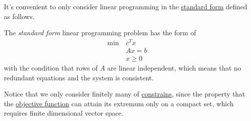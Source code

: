 It's convenient to only consider linear programming in the \hyperref[def:standard-form]{standard form} defined as follows.

\begin{definition}\label{def:standard-form}
	The \emph{standard form} linear programming problem has the form of
	\begin{align*}
		\min~ & c^Tx    \\
		      & Ax = b  \\
		      & x\geq 0
	\end{align*}
	with the condition that rows of \(A\) are linear independent, which means that no redundant equations  and the system is consistent.
\end{definition}

\begin{remark}
	Notice that we only consider finitely many of \hyperref[def:constraints]{constrains}, since the property that the \hyperref[def:objective-function]{objective function}
	can attain its extremum only on a compact set, which requires finite dimensional vector space.
\end{remark}

